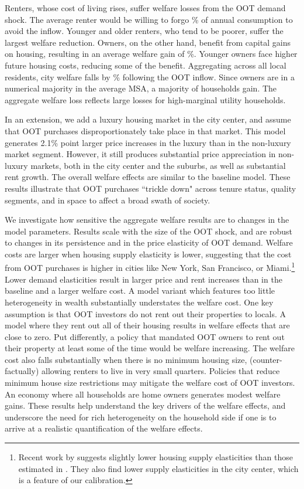 \documentclass[letterpaper,12pt,dvipsnames,usenames]{article}
\theoremstyle{definition}
\begin{document}
\begin{spacing}{1.25}
Renters, whose cost of living rises, suffer welfare losses from the OOT demand shock. The average renter would be willing to forgo {}\% of annual consumption to avoid the inflow. Younger and older renters, who tend to be poorer, suffer the largest welfare reduction.  Owners, on the other hand, benefit from capital gains on housing, resulting in an average welfare gain of  {}\%. Younger owners face higher future housing costs, reducing some of the benefit. Aggregating across all local residents, city welfare falls by {}\% following the OOT inflow. Since owners are in a numerical majority in the average MSA, a majority of households gain. The aggregate welfare loss reflects large losses for high-marginal utility households.

In an extension, we add a luxury housing market in the city center, and assume that OOT purchases disproportionately take place in that market. This model generates 2.1\% point larger price increases in the luxury than in the non-luxury market segment. However, it still produces substantial price appreciation in non-luxury markets, both in the city center and the suburbs, as well as substantial rent growth. The overall welfare effects are similar to the baseline model. These results illustrate that OOT purchases ``trickle down" across tenure status, quality segments, and in space to affect a broad swath of society.

We investigate how sensitive the aggregate welfare results are to changes in the model parameters. Results scale with the size of the OOT shock, and are robust to changes in its persistence and in the price elasticity of OOT demand. Welfare costs are larger when housing supply elasticity is lower, suggesting that the cost from OOT purchases is higher in cities like New York, San Francisco, or Miami.\footnote{Recent work by \citet{BaumHan2020} suggests slightly lower housing supply elasticities than those estimated in \citet{Saiz:10}. They also find lower supply elasticities in the city center, which is a feature of our calibration.} Lower demand elasticities result in larger price and rent increases than in the baseline and a larger welfare cost. A model variant which features too little heterogeneity in wealth substantially understates the welfare cost. One key assumption is that OOT investors do not rent out their properties to locals. A model where they rent out all of their housing results in welfare effects that are close to zero. Put differently, a policy that mandated OOT owners to rent out their property at least some of the time would be welfare increasing. The welfare cost also falls substantially when there is no minimum housing size, (counter-factually) allowing renters to live in very small quarters. Policies that reduce minimum house size restrictions may mitigate the welfare cost of OOT investors. An economy where all households are home owners generates modest welfare gains. These results help understand the key drivers of the welfare effects, and underscore the need for rich heterogeneity on the household side if one is to arrive at a realistic quantification of the welfare effects.


\end{spacing}
\end{document}
